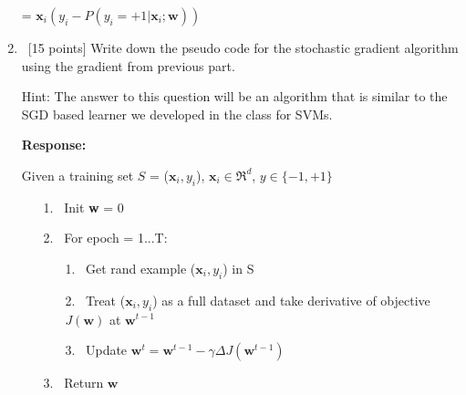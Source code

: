 \begin{enumerate}
	\hspace{5cm} = $\textbf{x}_i (y_i-P(y_i = +1 | \textbf{x}_i;\textbf{w}))$
	
\item~[15 points] Write down the pseudo code for the stochastic gradient
  algorithm using the gradient from previous part.

  Hint: The answer to this question will be an algorithm that is similar to the
  SGD based learner we developed in the class for SVMs.
  
  \textbf{Response:} \newline
  
  Given a training set $S$ = {($\textbf{x}_i, y_i$)}, $\textbf{x}_i \in \Re ^d$, $y \in \{-1, +1\}$
  \begin{enumerate}

  \item[1.]~Init \textbf{w} = 0
  \item[2.]~For epoch = 1...T:
  	\begin{enumerate}
	  	\item[1.]~Get rand example ($\textbf{x}_i, y_i$) in S
	 	\item[2.]~Treat ($\textbf{x}_i, y_i$) as a full dataset and take derivative of objective $J(\textbf{w})$ at $\textbf{w}^{t-1}$
	 	\item[3.]~Update $\textbf{w}^t = \textbf{w}^{t-1}-\gamma \Delta J(\textbf{w}^{t-1})$
 	\end{enumerate}
  \item[3.]~Return $\textbf{w}$ 
  \end{enumerate}
\end{enumerate}

